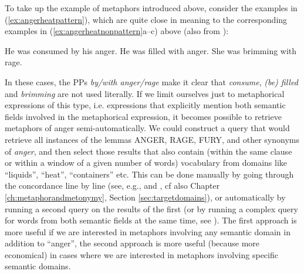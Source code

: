 To take up the example of metaphors introduced above, consider the examples in (\ref{ex:angerheatpattern}), which are quite close in meaning to the corresponding examples in (\ref{ex:angerheatnonpattern}a--c) above (also from \citet{lakoff_cognitive_1987}):

\begin{exe}
\ex
\begin{xlist} 
\label{ex:angerheatpattern}
\ex He was consumed by his anger.
\ex He was filled with anger.
\ex She was brimming with rage.
\end{xlist}
\end{exe}

In these cases, the PPs \textit{by/with anger/rage} make it clear that \textit{consume}, \textit{(be) filled} and \textit{brimming} are not used literally. If we limit ourselves just to metaphorical expressions of this type, i.e. expressions that explicitly mention both semantic fields involved in the metaphorical expression, it becomes possible to retrieve metaphors of anger semi-automatically. We could construct a query that would retrieve all instances of the lemmas ANGER, RAGE, FURY, and other synonyms of \textit{anger}, and then select those results that also contain (within the same clause or within a window of a given number of words) vocabulary from domains like ``liquids'', ``heat'', ``containers'' etc. This can be done manually by going through the concordance line by line (see, e.g., \citet{tissari_lovescapes:_2003} and \citet{stefanowitsch_happiness_2004, stefanowitsch_words_2006}, cf also Chapter \ref{ch:metaphorandmetonymy}, Section \ref{sec:targetdomains}), or automatically by running a second query on the results of the first (or by running a complex query for words from both semantic fields at the same time, see \citet{martin_corpus-based_2006}). The first approach is more useful if we are interested in metaphors involving any semantic domain in addition to ``anger'', the second approach is more useful (because more economical) in cases where we are interested in metaphors involving specific semantic domains.


